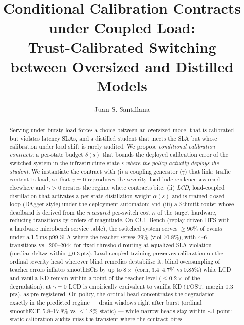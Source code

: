\documentclass[sigconf,nonacm]{acmart}
\title{Conditional Calibration Contracts under Coupled Load:\\
Trust-Calibrated Switching between Oversized and Distilled Models}
\author{Juan S. Santillana}
\affiliation{\institution{Independent research}\city{}\country{}}
\newcommand{\delt}{\delta}
\begin{document}
\begin{abstract}
Serving under bursty load forces a choice between an oversized model that is
calibrated but violates latency SLAs, and a distilled student that meets the
SLA but whose calibration under load shift is rarely audited. We propose
\emph{conditional calibration contracts}: a per-state budget
$\delt(s)$ that bounds the deployed calibration error of the switched system in
the infrastructure state $s$ \emph{where the policy actually deploys the
student}. We instantiate the contract with (i) a coupling generator
($\gamma$) that links traffic content to load, so that $\gamma{=}0$ reproduces
the severity--load independence assumed elsewhere and $\gamma{>}0$ creates the
regime where contracts bite; (ii) \emph{LCD}, load-coupled distillation that
activates a per-state distillation weight $\alpha(s)$ and is trained
closed-loop (DAgger-style) under the deployment automaton; and (iii) a Schmitt
router whose deadband is derived from the \emph{measured} per-switch cost
$\kappa$ of the target hardware, reducing transitions by orders of magnitude.
On CUL-Bench (replay-driven DES with a hardware microbench service table), the
switched system serves $\ge 96\%$ of events under a 1.5\,ms p99 SLA where the
teacher serves 29\% (viol 70.8\%), with 4--6 transitions vs.\ 200--2044
for fixed-threshold routing at equalized SLA violation (median deltas
within $\pm$0.3\,pts). Load-coupled training
preserves calibration on the ordinal severity head wherever blind remedies
destabilize it: blind oversampling of teacher errors inflates smoothECE by
up to $8\times$ (corn, 3.4--4.7\% vs 0.85\%) while LCD and vanilla KD remain
within a point of the teacher level ($\le 0.2\times$ of the degradation); at $\gamma{=}0$
LCD is empirically equivalent to vanilla KD (TOST, margin 0.3 pts), as
pre-registered. On-policy, the ordinal head concentrates the degradation
exactly in the predicted regime --- drain windows right after burst
(ordinal smoothECE 5.8--17.8\% vs $\le$1.2\% static) --- while narrow
heads stay within $\sim$1 point: static calibration audits miss the
transient where the contract bites.
\end{abstract}


\maketitle
\end{document}
